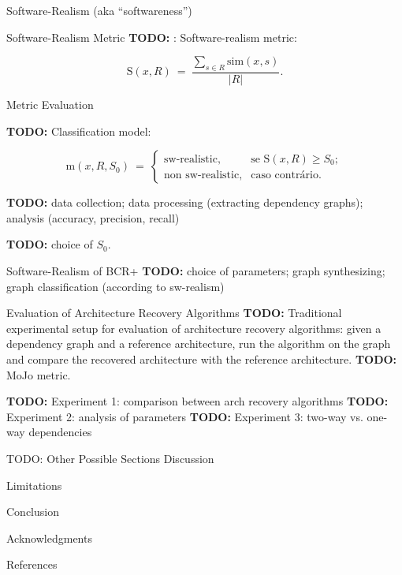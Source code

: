 \documentclass[11pt,twocolumn,a4paper,english]{article}
\newcommand{\TODO}{\textbf{TODO:} }
\begin{document}
\begin{section}{Software-Realism (aka “softwareness”)}
\begin{subsection}{Software-Realism Metric}
	\TODO: Software-realism metric:
	
	$$
  \mathrm{S}(x, R) ~=~ \frac{
  \displaystyle\sum_{s \in R} \mathrm{sim}(x, s)
  }{|R|} \mbox{.}
  $$

\end{subsection}
	
\begin{subsection}{Metric Evaluation}
	
	\TODO Classification model:
	
	$$
	  \mathrm{m}(x, R, S_0) ~=~
	  \left\{
	  \begin{array}{cl}
	  \mbox{sw-realistic,} & \mbox{se } \mathrm{S}(x, R) \ge S_0; \\
	  \mbox{non sw-realistic,} & \mbox{caso contrário.}
	  \end{array}
	  \right.
	$$	
	
	\TODO data collection; data processing (extracting dependency graphs); analysis (accuracy, precision, recall)
	
	\TODO choice of $S_0$.
	
\end{subsection}
	
\begin{subsection}{Software-Realism of BCR+}
	\TODO choice of parameters; graph synthesizing; graph classification (according to sw-realism)
\end{subsection}
	
\end{section}


\begin{section}{Evaluation of Architecture Recovery Algorithms}
	\TODO Traditional experimental setup for evaluation of architecture recovery algorithms: given a dependency graph and a reference architecture, run the algorithm on the graph and compare the recovered architecture with the reference architecture.
	\TODO MoJo metric.
	
	\TODO Experiment 1: comparison between arch recovery algorithms
	\TODO Experiment 2: analysis of parameters
	\TODO Experiment 3: two-way vs. one-way dependencies
\end{section}


\begin{section}{TODO: Other Possible Sections}
	Discussion
	
	Limitations
	
	Conclusion
	
	Acknowledgments
	
	References	
\end{section}




\end{document}
